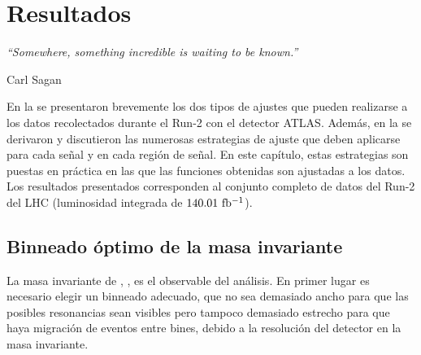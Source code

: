 \chapter{Resultados}
\label{ch:results}
\epigraph{\emph{“Somewhere, something incredible is waiting to be known.”}}{Carl Sagan}


En la \Ch{\ref{ch:strategy}} se presentaron brevemente los dos tipos de ajustes que pueden realizarse a los datos recolectados durante el Run-2 con el detector \ac{ATLAS}. Además, en la \Sect{\ref{sec:bkg:modeling}} se derivaron y discutieron las numerosas estrategias de ajuste que deben aplicarse para cada señal y en cada región de señal. En este capítulo, estas estrategias son puestas en práctica en las que las funciones obtenidas son ajustadas a los datos. Los resultados presentados corresponden al conjunto completo de datos del Run-2 del \ac{LHC} (luminosidad integrada de \(140.01~\ifb\)).














\section{Binneado óptimo de la masa invariante}
\label{sec:results:obs}


La masa invariante de \gammajet, \myj, es el observable del análisis. En primer lugar es necesario elegir un binneado adecuado, que no sea demasiado ancho para que las posibles resonancias sean visibles pero tampoco demasiado estrecho para que haya migración de eventos entre bines, debido a la resolución del detector en la masa invariante.

